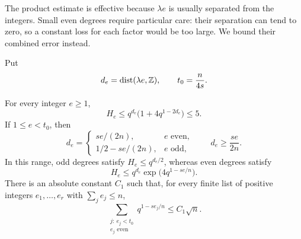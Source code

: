The product estimate is effective because $\lambda e$ is usually
separated from the integers.  Small even degrees require particular
care: their separation can tend to zero, so a constant loss for each
factor would be too large.  We bound their combined error instead.

Put
\[
 d_e=\operatorname{dist}(\lambda e,\mathbb Z),\qquad t_0=\frac{n}{4s}.
\]
\begin{lemma}
\label{lem:degree-estimates}
For every integer $e\ge1$,
\begin{equation}
\label{eq:nearest-integer-bound}
 H_e\le q^{d_e}\bigl(1+4q^{1-2d_e}\bigr)\le5.
\end{equation}
If $1\le e<t_0$, then
\begin{equation}
\label{eq:low-degree-distances}
 d_e=
 \begin{cases}
   se/(2n),&e\text{ even},\\
   1/2-se/(2n),&e\text{ odd},
 \end{cases}
 \qquad d_e\ge\frac{se}{2n}.
\end{equation}
In this range, odd degrees satisfy $H_e\le q^{d_e/2}$, whereas even
degrees satisfy
\begin{equation}
\label{eq:even-degree-bound}
 H_e\le q^{d_e}\exp\bigl(4q^{1-se/n}\bigr).
\end{equation}
There is an absolute constant $C_1$ such that, for every finite list of
positive integers $e_1,\ldots,e_r$ with $\sum_j e_j\le n$,
\begin{equation}
\label{eq:even-corrections}
 \sum_{\substack{j:\ e_j<t_0\\ e_j\text{ even}}}
 q^{1-se_j/n}\le C_1\sqrt n.
\end{equation}
\end{lemma}

